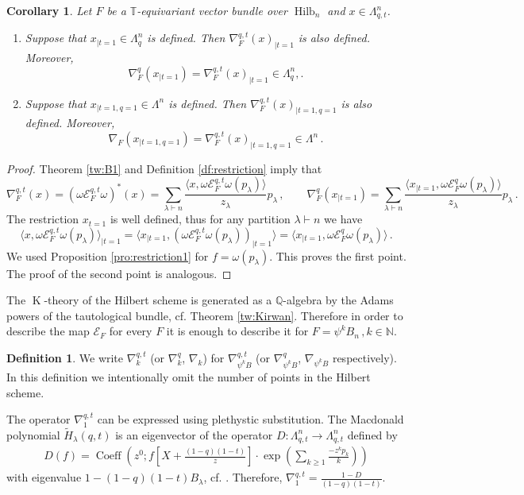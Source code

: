\documentclass[12pt,a4paper]{amsart}
\theoremstyle{plain}
\newtheorem{cor}[tw]{Corollary}
\theoremstyle{definition}
\newtheorem{df}[tw]{Definition}
\theoremstyle{remark}
\newcommand{\Hilb}[1]{\operatorname{Hilb}_{{#1}}}
\newcommand{\NN}{\mathbb{N}}
\newcommand{\QQ}{\mathbb{Q}}
\newcommand{\TT}{\mathbb{T}}
\newcommand{\E}{\mathcal{E}}
\DeclareMathOperator{\KTh}{K}
\begin{document}
\begin{cor}
	Let $F$ be a $\TT$-equivariant vector bundle over $\Hilb{n}$ and $x\in \Lambda^n_{q,t}$.
	\begin{enumerate}
			\item Suppose that $x_{|t=1} \in \Lambda^n_{q}$ is defined. Then $\nabla_F^{q,t}(x)_{|t=1}$ is also defined. Moreover,
			$$\nabla_F^{q}(x_{|t=1})=\nabla_F^{q,t}(x)_{|t=1} \in \Lambda^n_{q},.$$
			\item Suppose that $x_{|t=1,q=1} \in \Lambda^n$ is defined. Then $\nabla_F^{q,t}(x)_{|t=1,q=1}$ is also defined. Moreover,
			$$\nabla_F(x_{|t=1,q=1})=\nabla_F^{q,t}(x)_{|t=1,q=1} \in \Lambda^n\,.$$
		\end{enumerate}
\end{cor}
\begin{proof}
	Theorem \ref{tw:B1} and Definition \ref{df:restriction} imply that 
	$$\nabla^{q,t}_F(x)=(\omega\E^{q,t}_F\omega)^*(x)=\sum_{\lambda\vdash n}
	\frac{\langle x, \omega\E^{q,t}_F\omega(p_\lambda) \rangle}{z_\lambda} p_\lambda\,,
	\qquad
	\nabla^{q}_F(x_{|t=1})
	=\sum_{\lambda\vdash n}
	\frac{\langle x_{|t=1}, \omega\E^{q}_F\omega(p_\lambda) \rangle}{z_\lambda} p_\lambda\,.
	$$
	The restriction $x_{t=1}$ is well defined, thus for any partition $\lambda\vdash n$ we have
	$$
	\langle x, \omega\E^{q,t}_F\omega(p_\lambda) \rangle_{|t=1}=
	\langle x_{|t=1}, (\omega\E^{q,t}_F\omega(p_\lambda))_{|t=1} \rangle=
	\langle x_{|t=1}, \omega\E^{q}_F\omega(p_\lambda) \rangle\,.
	$$
	We used Proposition \ref{pro:restriction1} for $f=\omega(p_\lambda)$. This proves the first point.
	\\
	The proof of the second point is analogous.
\end{proof}

\noindent The $\KTh$-theory of the Hilbert scheme is generated as a $\QQ$-algebra by the Adams powers of the tautological bundle, cf. Theorem \ref{tw:Kirwan}. Therefore in order to describe the map $\E_F$ for every $F$ it is enough to describe it for $F=\psi^kB_n\,, k\in \NN$.
\begin{df}
	We write $\nabla_k^{q,t}$ (or $\nabla_k^{q}$, $\nabla_k$) for $\nabla^{q,t}_{\psi^kB}$ (or $\nabla_{\psi^kB}^{q}$, $\nabla_{\psi^kB}$ respectively). In this definition we intentionally omit the number of points in the Hilbert scheme.
\end{df}

The operator $\nabla_1^{q,t}$ can be expressed using   plethystic substitution. The Macdonald polynomial $\tilde{H}_\lambda(q,t)$ is an eigenvector of the operator $D:\Lambda^n_{q,t} \to \Lambda^n_{q,t}$ defined by
\begin{align} \label{w:5}
	D(f)=\operatorname{Coeff} \left(z^0; f\left[X+\frac{(1-q)(1-t)}{z}\right]\cdot \exp\left(\sum_{k\ge 1}\frac{-z^kp_k}{k} \right)\right) 
\end{align}
with eigenvalue $1-(1-q)(1-t)B_{\lambda}$, cf. \cite[Corollary 3.5.5]{Haiman_surv}. Therefore, \hbox{$\nabla_1^{q,t}=\frac{1-D}{(1-q)(1-t)}$.}
\end{document}
